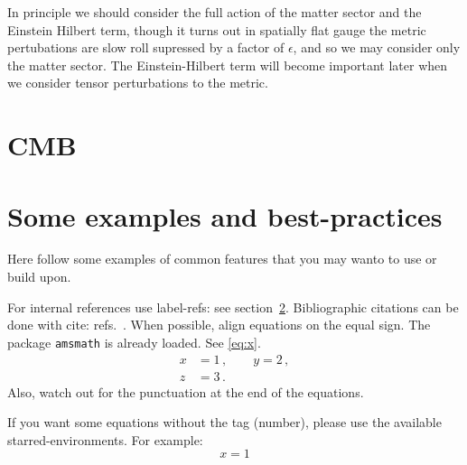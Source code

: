 \documentclass[a4paper,11pt]{article}
\begin{document}
 In principle we should consider the full action of the matter sector and the Einstein Hilbert term, though it turns out in spatially flat gauge the metric pertubations are slow roll supressed by a factor of $\epsilon$, and so we may consider only the matter sector. The Einstein-Hilbert term will become important later when we consider tensor perturbations to the metric.\\
































\section{CMB}


\section{Some examples and best-practices}
\label{sec:intro}

Here follow some examples of common features that you may wanto to use
or build upon.

For internal references use label-refs: see section~\ref{sec:intro}.
Bibliographic citations can be done with cite: refs.~\cite{a,b,c}.
When possible, align equations on the equal sign. The package
\texttt{amsmath} is already loaded. See \eqref{eq:x}.
\begin{equation}
\label{eq:x}
\begin{split}
x &= 1 \,,
\qquad
y = 2 \,,
\\
z &= 3 \,.
\end{split}
\end{equation}
Also, watch out for the punctuation at the end of the equations.


If you want some equations without the tag (number), please use the available
starred-environments. For example:
\begin{equation*}
x = 1
\end{equation*}
\end{document}
